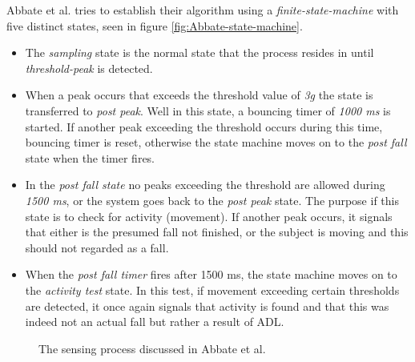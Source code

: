 \documentclass[12pt, a4paper, onecolumn]{article}
\begin{document}
	Abbate et al. tries to establish their algorithm using a \textit{finite-state-machine} with five distinct states, seen in figure \ref{fig:Abbate-state-machine}.
	
	\begin{itemize}
		\item The \textit{sampling} state is the normal state that the process resides in until \textit{threshold-peak} is detected.
		
		\item When a peak occurs that exceeds the threshold value of \textit{3g} the state is transferred to \textit{post peak}. Well in this state, a bouncing timer of \textit{1000 ms} is started. If another peak exceeding the threshold occurs during this time, bouncing timer is reset, otherwise the state machine moves on to the \textit{post fall} state when the timer fires.
		
		\item In the \textit{post fall state} no peaks exceeding the threshold are allowed during \textit{1500 ms}, or the system goes back to the \textit{post peak} state. The purpose if this state is to check for activity (movement). If another peak occurs, it signals that either is the presumed fall not finished, or the subject is moving and this should not regarded as a fall. 
		
		\item When the \textit{post fall timer} fires after 1500 ms, the state machine moves on to the \textit{activity test} state. In this test, if movement exceeding certain thresholds are detected, it once again signals that activity is found and that this was indeed not an actual fall but rather a result of ADL. 
		
	\end{itemize}  
	
	
	\begin{figure}[H]
		\centering
		\caption{The sensing process discussed in Abbate et al.}%
		\label{fig:abbatea-state-machine}%
	\end{figure}
	
\end{document}
